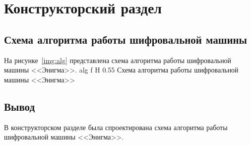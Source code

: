 \chapter{Конструкторский раздел}

\section{Схема алгоритма работы шифровальной машины}

На рисунке~\ref{img:alg} представлена схема алгоритма работы шифровальной машины <<Энигма>>.
	{alg}
	{f}
	{H}
	{0.55\textwidth}
	{Схема алгоритма работы шифровальной машины <<Энигма>>}

\section*{Вывод}

В конструкторском разделе была спроектирована схема алгоритма работы шифровальной машины <<Энигма>>.
